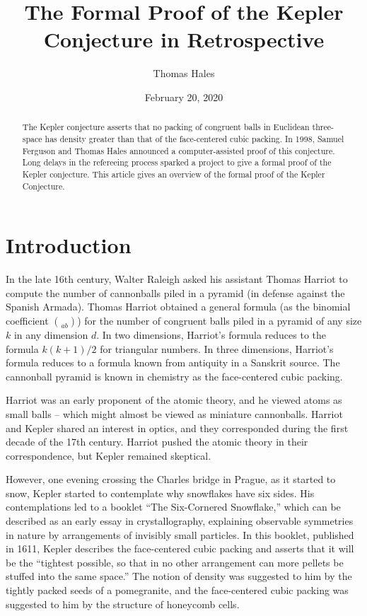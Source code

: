 \documentclass{amsart}
\title{The Formal Proof of the Kepler Conjecture in Retrospective}
\author{Thomas Hales}
\date{}
\date{February 20, 2020}
\begin{document}
\maketitle

\begin{abstract} 
  The Kepler conjecture asserts that no packing of congruent balls in
  Euclidean three-space has density greater than that of the
  face-centered cubic packing.  In 1998, Samuel Ferguson and Thomas
  Hales announced a computer-assisted proof of this conjecture.  Long
  delays in the refereeing process sparked a project to give a formal
  proof of the Kepler conjecture.  This article gives an overview of
  the formal proof of the Kepler Conjecture.
\end{abstract}

\baselineskip
{}\baselineskip

\newenvironment{blockquote}{%
  \par%
  \medskip%
  \baselineskip=0.7\baselineskip%
  \leftskip=2em\rightskip=2em%
  \noindent\ignorespaces}{%
  \par\medskip}

\section{Introduction}

In the late 16th century, Walter Raleigh asked his assistant Thomas
Harriot to compute the number of cannonballs piled in a pyramid (in
defense against the Spanish Armada).  Thomas Harriot obtained a
general formula (as the binomial coefficient $\choose{a}{b}$) for the
number of congruent balls piled in a pyramid of any size $k$ in any
dimension $d$.  In two dimensions, Harriot's formula reduces to the
formula $k(k+1)/2$ for triangular numbers.  In three dimensions,
Harriot's formula reduces to a formula known from antiquity in a
Sanskrit source.  The cannonball pyramid is known in chemistry as the
face-centered cubic packing.

Harriot was an early proponent of the atomic theory, and he viewed
atoms as small balls -- which might almost be viewed as miniature
cannonballs.  Harriot and Kepler shared an interest in optics, and
they corresponded during the first decade of the 17th century.
Harriot pushed the atomic theory in their correspondence, but Kepler
remained skeptical.

However, one evening crossing the Charles bridge in Prague, as it
started to snow, Kepler started to contemplate why snowflakes have six
sides.  His contemplations led to a booklet ``The Six-Cornered
Snowflake,'' which can be described as an early essay in
crystallography, explaining observable symmetries in nature by
arrangements of invisibly small particles.  In this booklet, published
in 1611, Kepler describes the face-centered cubic packing and asserts
that it will be the ``tightest possible, so that in no other
arrangement can more pellets be stuffed into the same space.'' The
notion of density was suggested to him by the tightly packed seeds of
a pomegranite, and the face-centered cubic packing was suggested to
him by the structure of honeycomb cells.
\end{document}
